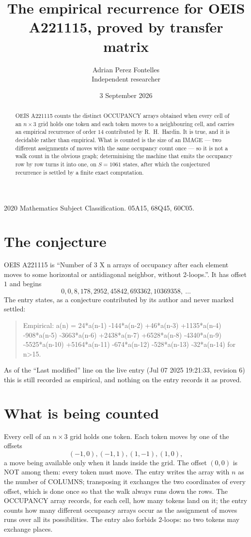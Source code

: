 \documentclass[11pt,a4paper]{article}
\title{The empirical recurrence for OEIS A221115, proved by transfer matrix}
\author{Adrian Perez Fontelles\\ \small Independent researcher}
\date{3 September 2026}
\theoremstyle{plain}
\theoremstyle{definition}
\begin{document}
\maketitle

\begin{abstract}
OEIS A221115 counts the distinct OCCUPANCY arrays obtained when every cell of an $n\times3$ grid
holds one token and each token moves to a neighbouring cell, and carries an empirical
recurrence of order $14$ contributed by R.~H.~Hardin. It is true, and it is decidable
rather than empirical. What is counted is the size of an IMAGE --- two different assignments of
moves with the same occupancy count once --- so it is not a walk count in the obvious graph;
determinising the machine that emits the occupancy row by row turns it into one, on $S=1061$
states, after which the conjectured recurrence is settled by a finite exact computation.
\end{abstract}

\noindent\small 2020 Mathematics Subject Classification. 05A15, 68Q45, 60C05.\normalsize

\section{The conjecture}

OEIS A221115 is ``Number of 3 X n arrays of occupancy after each element moves to some horizontal or antidiagonal neighbor, without 2-loops.''. It has offset $1$ and begins
\[
0, 0, 8, 178, 2952, 45842, 693362, 10369358,\ \dots
\]
The entry states, as a conjecture contributed by its author and never marked settled:
\begin{quote}
Empirical: a(n) = 24*a(n-1) -144*a(n-2) +46*a(n-3) +1135*a(n-4) -908*a(n-5) -3663*a(n-6) +2438*a(n-7) +6528*a(n-8) -4340*a(n-9) -5525*a(n-10) +5164*a(n-11) -674*a(n-12) -528*a(n-13) -32*a(n-14) for n>15.
\end{quote}
As of the ``Last modified'' line on the live entry (Jul 07 2025 19:21:33, revision 6) this is still
recorded as empirical, and nothing on the entry records it as proved.

\section{What is being counted}

Every cell of an $n\times3$ grid holds one token. Each token moves by one of the offsets
\[
(-1,0), (-1,1), (1,-1), (1,0),
\]
a move being available only when it lands inside the grid. The offset $(0,0)$ is NOT among them: every token must move. The entry writes the array with $n$ as the number of COLUMNS; transposing it exchanges the two coordinates of every offset, which is done once so that the walk always runs down the rows. The OCCUPANCY array
records, for each cell, how many tokens land on it; the entry counts how many different
occupancy arrays occur as the assignment of moves runs over all its possibilities. The entry also forbids $2$-loops: no two tokens may exchange places.
\end{document}
